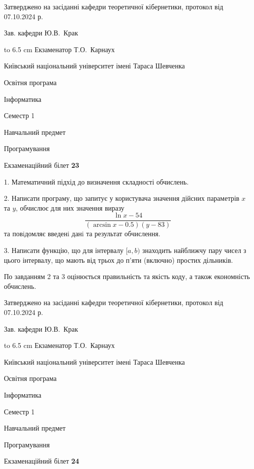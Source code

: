 \documentclass[12pt, ukrainian]{article}
\begin{document}
{\smallskip\smallskip \begin {scriptsize} Затверджено на засіданні кафедри теоретичної кібернетики, протокол   від   07.10.2024 р.\par\smallskip\smallskip\smallskip\smallskip
{\parbox {6.5 cm} {Зав. кафедри \dotfill Ю.В.~Крак}}\hspace {0.7cm} {\hbox to 6.5 cm { Екзаменатор \dotfill Т.О.~Карнаух}} \end{scriptsize}}
\vspace{0.9cm}
{{\begin {scriptsize}\par
{ \center  Київський національний університет імені Тараса Шевченка \par}
{\parbox {5 cm}{Освітня програма \hfill}{\parbox {7 cm}{Інформатика\hfill}}\parbox {6 cm}{\hfill Семестр 1}}\par
{\parbox {5 cm} {Навчальний предмет \hfill}\parbox {7 cm}{Програмування \hfill}\parbox {6cm}{\hfill}\par}\vspace{-15pt} \end{scriptsize}}{\center Екзаменаційний білет \No \textbf { 23 }\par}}
{%
1. Математичний підхід до визначення складності обчислень.%
\par
2. Написати програму, що запитує у користувача значення дійсних параметрів $x$ та $y$, обчислює для них значення виразу 
$$\frac{\ln x - 54}{(\arcsin x - 0.5) (y - 83)}$$ 
та повiдомляє введенi данi та результат обчислення.

\par
3. Написати функцію, що для інтервалу $[a, b)$ знаходить найближчу пару чисел з цього інтервалу, що мають від трьох до п'яти (включно) простих дільників.

По завданням 2 та 3 оцінюється правильність та якість коду, а також економність обчислень.

}
{\smallskip\smallskip \begin {scriptsize} Затверджено на засіданні кафедри теоретичної кібернетики, протокол   від   07.10.2024 р.\par\smallskip\smallskip\smallskip\smallskip
{\parbox {6.5 cm} {Зав. кафедри \dotfill Ю.В.~Крак}}\hspace {0.7cm} {\hbox to 6.5 cm { Екзаменатор \dotfill Т.О.~Карнаух}} \end{scriptsize}}
\vspace{0.9cm}
{{\begin {scriptsize}\par
{ \center  Київський національний університет імені Тараса Шевченка \par}
{\parbox {5 cm}{Освітня програма \hfill}{\parbox {7 cm}{Інформатика\hfill}}\parbox {6 cm}{\hfill Семестр 1}}\par
{\parbox {5 cm} {Навчальний предмет \hfill}\parbox {7 cm}{Програмування \hfill}\parbox {6cm}{\hfill}\par}\vspace{-15pt} \end{scriptsize}}{\center Екзаменаційний білет \No \textbf { 24 }\par}}
\end{document}
